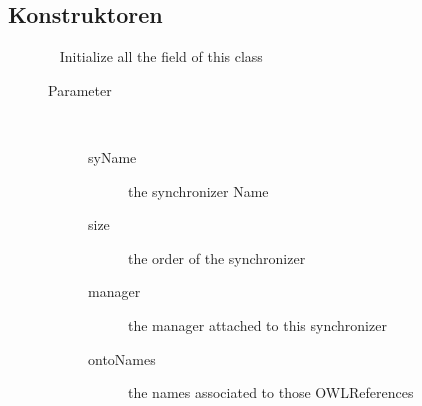 \subsection{Konstruktoren}
\begin{description}
\item[{\label{ontologyFramework.OFContextManagement.synchronisingManager.OFSerializeSynchroniserData(java.lang.String,int,ontologyFramework.OFContextManagement.synchronisingManager.OFSynchroniserManagmentInterface,java.util.List<java.lang.String>)}}]
~ Initialize all the field of this class
\begin{description}
\item[Parameter] ~
\begin{description}
\item[syName]
the synchronizer Name
\item[size]
the order of the synchronizer
\item[manager]
the manager attached to this synchronizer
\item[ontoNames]
the names associated to those OWLReferences
\end{description}
\end{description}
\end{description}
